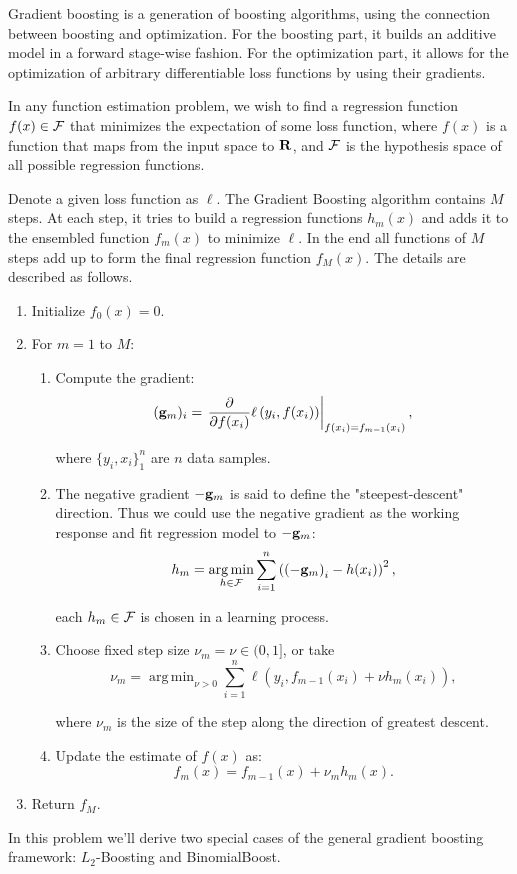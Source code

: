 \documentclass{article}
\theoremstyle{definition}
\theoremstyle{definition}
\theoremstyle{remark}
\DeclareMathOperator*{\argmin}{arg\,min}
\begin{document}
Gradient boosting is a generation of boosting algorithms, using the connection between boosting and optimization. 
For the boosting part, it builds an additive model in a forward stage-wise fashion. For the optimization part, it allows for the optimization of arbitrary differentiable loss functions by using their gradients.

In any function estimation problem, we wish to find a regression function $f(x) \in \mathcal{F}$ that minimizes the expectation of some loss function, where $f(x)$ is a function that maps from the input space to $\mathbf{R}$, and $\mathcal{F}$ is the hypothesis space of all possible regression functions.

Denote a given loss function as $\ell$.
The Gradient Boosting algorithm contains $M$ steps. At each step, it tries to build a regression functions $h_m(x)$ and adds it to the ensembled function $f_m(x)$ to minimize $\ell$. In the end all functions of $M$ steps add up to form the final regression function $f_M(x)$. The details are described as follows. 

\begin{enumerate}
\item Initialize $f_{0}(x)=0$. 
\item For $m=1$ to $M$:

\begin{enumerate}
\item Compute the gradient: 
\[
({\bf g}_{m})_i=\left.\frac{\partial}{\partial f(x_{i})}\ell\left( y_{i},f(x_{i})\right) \right|_{f(x_{i})=f_{m-1}(x_{i})} ,
\]

where $\{y_i, x_i\}_{1}^{n}$ are $n$ data samples.
\item The negative gradient $-{\bf g}_{m}$ is said to define the "steepest-descent" direction. Thus we could use the negative gradient as the working response and fit regression model to $-{\bf g}_{m}$: 
\[
h_{m}=\argmin_{h\in\cf}\sum_{i=1}^{n}\left(\left(-{\bf g}_{m}\right)_{i}-h(x_{i})\right)^{2},
\]

each $h_m \in \mathcal{F}$ is chosen in a learning process.

\item Choose fixed step size $\nu_{m}=\nu\in(0,1]$, or take 
\[
\nu_{m}=\argmin_{\nu>0}\sum_{i=1}^{n}\ell\left( y_{i},f_{m-1}(x_{i})+\nu h_{m}(x_{i})\right) ,
\]

where $\nu_{m}$ is the size of the step along the direction of greatest descent.

\item Update the estimate of $f(x)$ as: 
\[
f_{m}(x)=f_{m-1}(x)+\nu_{m}h_{m}(x).
\]

\end{enumerate}
\item Return $f_{M}$. 
\end{enumerate}
In this problem we'll derive two special cases of the general gradient
boosting framework: $L_{2}$-Boosting and BinomialBoost. 
\end{document}

